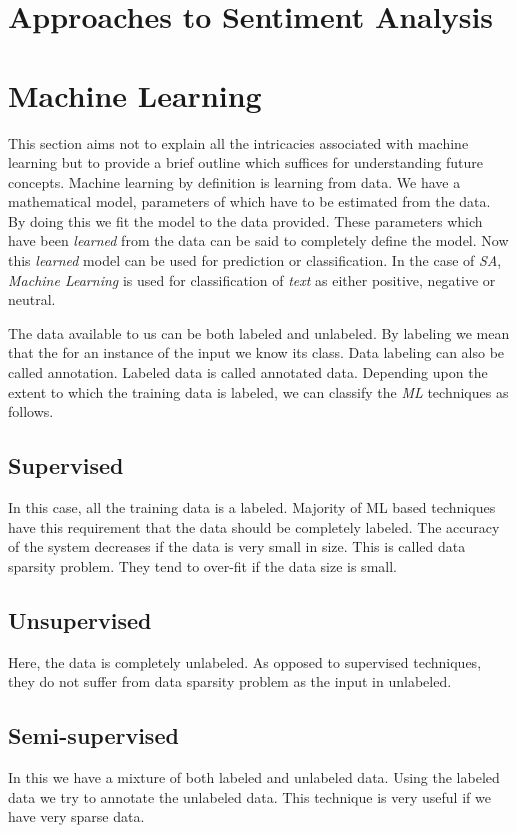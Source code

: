 \section*{Approaches to Sentiment Analysis}

\section{Machine Learning}

\par

This section aims not to explain all the intricacies associated with machine learning but to provide a brief outline
which suffices for understanding future concepts. Machine learning by definition is learning from data. We have a mathematical
model, parameters of which have to be estimated from the data. By doing this we fit the model to the data provided. 
These parameters which have been \textit{learned} from the data can be said to completely define the model. Now this 
\textit{learned} model can be used for prediction or classification. In the case of \textit{SA}, \textit{Machine Learning} is used for classification
of \textit{text} as either positive, negative or neutral.

\par
The data available to us can be both labeled and unlabeled. By labeling we mean that the for an instance of the input we know
its class. Data labeling can also be called annotation. Labeled data is called annotated data. Depending upon the extent to which
the training data is labeled, we can classify the \textit{ML} techniques as follows.

\subsection{Supervised}
In this case, all the training data is a labeled. Majority of ML based techniques have this requirement that the data should be
completely labeled. The accuracy of the system decreases if the data is very small in size. This is called data sparsity problem.
They tend to over-fit if the data size is small.
\subsection{Unsupervised}
Here, the data is completely unlabeled. As opposed to supervised techniques, they do not suffer from data sparsity problem as 
the input in unlabeled.
\subsection{Semi-supervised}\label{subsection:semisupervised}
In this we have a mixture of both labeled and unlabeled data. Using the labeled data we try to annotate the unlabeled data. 
This technique is very useful if we have very sparse data.

